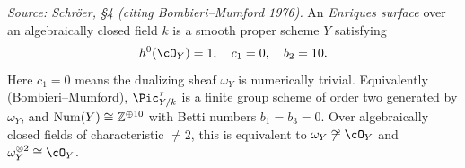 \begin{definition}
  \label{def:enriques-surface}
  \textit{Source: Schr\"oer, §4 (citing Bombieri--Mumford 1976).}
  An \emph{Enriques surface} over an algebraically closed field \(k\) is a smooth proper scheme \(Y\) satisfying
  \[
    h^0(\cO_Y) = 1, \quad c_1 = 0, \quad b_2 = 10.
  \]
  Here \(c_1 = 0\) means the dualizing sheaf \(\omega_Y\) is numerically trivial.
  Equivalently (Bombieri--Mumford), \(\Pic^{\tau}_{Y/k}\) is a finite group scheme of order two generated by \(\omega_Y\),
  and \(\mathrm{Num}(Y) \cong \mathbb{Z}^{\oplus 10}\) with Betti numbers \(b_1 = b_3 = 0\).
  Over algebraically closed fields of characteristic \(\neq 2\), this is equivalent to
  \(\omega_Y \not\cong \cO_Y\) and \(\omega_Y^{\otimes 2} \cong \cO_Y\).
\end{definition}

